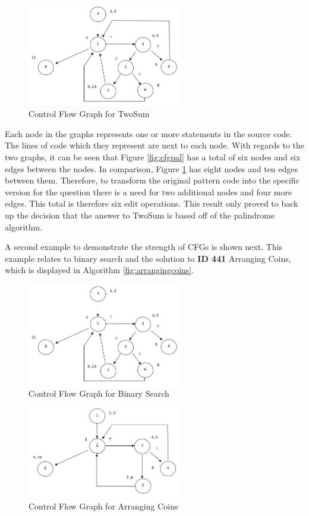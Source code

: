 \documentclass[10pt,twocolumn,hidelinks]{IEEEtran}
\begin{document}
 \begin{figure}[h]
\includegraphics[width=0.6\textwidth]{CFGTwoSum.png}
\caption{Control Flow Graph for TwoSum}
\label{fig:cfgtwosum}
\end{figure}
\par Each node in the graphs represents one or more statements in the source code. The lines of code which they represent are next to each node. With regards to the two graphs, it can be seen that Figure \ref{fig:cfgpal} has a total of six nodes and six edges between the nodes. In comparison, Figure \ref{fig:cfgtwosum} has eight nodes and ten edges between them. Therefore, to transform the original pattern code into the specific version for the question there is a need for two additional nodes and four more edges. This total is therefore six edit operations. This result only proved to back up the decision that the answer to TwoSum is based off of the palindrome algorithm.
\par A second example to demonstrate the strength of CFGs is shown next. This example relates to binary search and the solution to \textbf{ID 441} Arranging Coins, which is displayed in Algorithm \ref{fig:arrangingcoins}. 
 \begin{figure}[h]
\includegraphics[width=0.6\textwidth]{CFGBinarySearch.png}
\caption{Control Flow Graph for Binary Search}
\label{fig:cfgbinarysearch}
\end{figure}
 \begin{figure}[h]
\includegraphics[width=0.6\textwidth]{CFGArrangingCoins.png}
\caption{Control Flow Graph for Arranging Coins}
\label{fig:cfgbinarysearch}
\end{figure}
\end{document}
